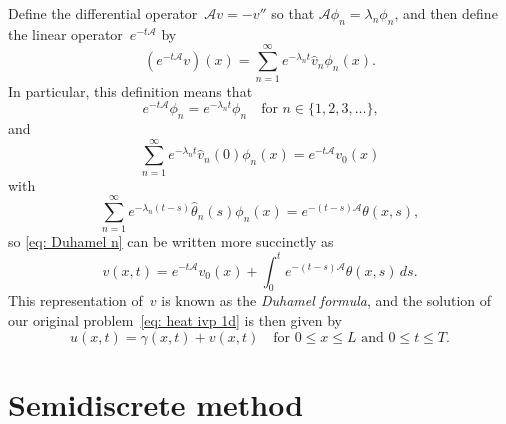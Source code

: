 Define the differential operator~$\mathcal{A}v=-v''$ so that 
$\mathcal{A}\phi_n=\lambda_n\phi_n$, and then define the linear 
operator~$e^{-t\mathcal{A}}$ by
\[
(e^{-t\mathcal{A}}v)(x)=\sum_{n=1}^\infty e^{-\lambda_nt}\hat v_n\phi_n(x).
\]
In particular, this definition means that
\[
e^{-t\mathcal{A}}\phi_n=e^{-\lambda_nt}\phi_n
	\quad\text{for $n\in\{1,2,3,\ldots\}$,}
\]
and
\[
\sum_{n=1}^\infty e^{-\lambda_nt}\hat v_n(0)\phi_n(x)=e^{-t\mathcal{A}}v_0(x)
\]
with
\[
\sum_{n=1}^\infty e^{-\lambda_n(t-s)}\hat\theta_n(s)\phi_n(x)
	=e^{-(t-s)\mathcal{A}}\theta(x,s),
\]
so \eqref{eq: Duhamel n} can be written more succinctly as
\[
v(x,t)=e^{-t\mathcal{A}}v_0(x)+\int_0^te^{-(t-s)\mathcal{A}}\theta(x,s)\,ds.
\]
This representation of~$v$ is known as the \emph{Duhamel formula}, and the 
solution of our original problem~\eqref{eq: heat ivp 1d} is then given by
\[
u(x,t)=\gamma(x,t)+v(x,t)\quad\text{for $0\le x\le L$ and $0\le t\le T$.}
\]

\section{Semidiscrete method}

